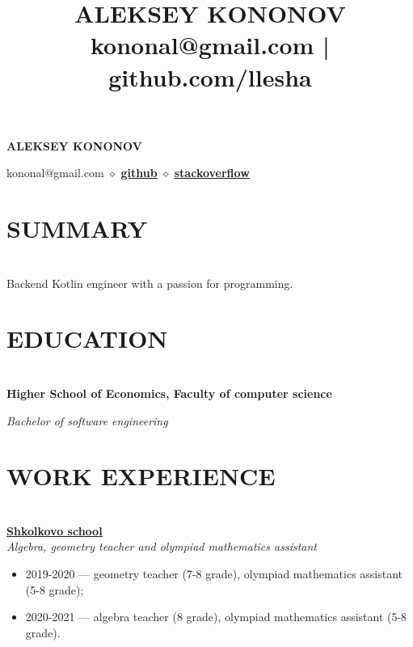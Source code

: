 \documentclass{article}
\title{ALEKSEY KONONOV\\\normalsize{kononal@gmail.com | github.com/llesha}}
\date{ }
\begin{document}
\begin{center}
\huge{\textbf{\quad \quad \quad \quad \quad \quad ALEKSEY KONONOV}}

\normalsize{\hspace{4.5cm} kononal@gmail.com $\diamond$ \href{https://github.com/llesha}{{\textbf{\underline{github}}}}} $\diamond$ \href{https://stackoverflow.com/users/19933941/llesha}{{\textbf{\underline{stackoverflow}}}}
\end{center}

\section*{SUMMARY}
\makebox[530pt]{\rule{570pt}{0.4pt}}\\
\noindent Backend Kotlin engineer with a passion for programming.

\section*{EDUCATION}
\makebox[530pt]{\rule{570pt}{0.4pt}}\\

\noindent\textbf{Higher School of Economics, Faculty of computer science}

\noindent \textit{Bachelor of software engineering}

\section*{WORK EXPERIENCE}
\makebox[530pt]{\rule{570pt}{0.4pt}}\\

\noindent\href{https://shkolkovo.net/}{{\textbf{\underline{Shkolkovo school}}}}
\\\textit{Algebra, geometry teacher and olympiad mathematics assistant}
\begin{itemize}
 \item 2019-2020 — geometry teacher (7-8 grade), olympiad mathematics assistant (5-8 grade);
 \item 2020-2021 — algebra teacher (8 grade), olympiad mathematics assistant (5-8 grade).
\end{itemize}
\end{document}
